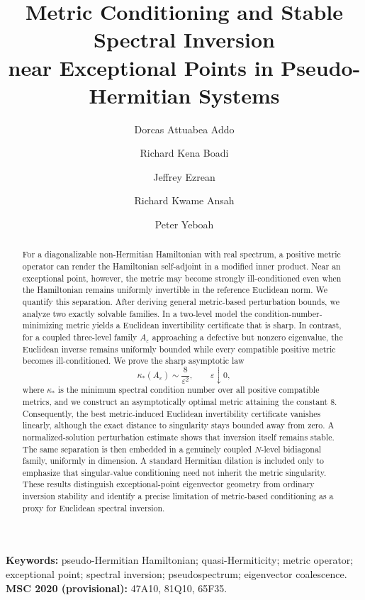 \documentclass[11pt,a4paper]{article}
\title{\bfseries Metric Conditioning and Stable Spectral Inversion\\[3pt]
 near Exceptional Points in Pseudo-Hermitian Systems}
\author[1]{Dorcas Attuabea Addo}
\author[2]{Richard Kena Boadi}
\author[2]{Jeffrey Ezrean}
\author[3]{Richard Kwame Ansah}
\author[4]{Peter Yeboah}
\affil[1]{Department of Mathematics Education, University of Education, Winneba, Ghana}
\affil[2]{Department of Mathematics, Kwame Nkrumah University of Science and Technology, Kumasi, Ghana}
\affil[3]{Department of Mathematics and Statistics, University of Energy and Natural Resources, Sunyani, Ghana}
\affil[4]{Department of Teacher Education, Kwame Nkrumah University of Science and Technology, Kumasi, Ghana}
\date{}
\theoremstyle{definition}\newtheorem{definition}[theorem]{Definition}
\theoremstyle{remark}\newtheorem{remark}[theorem]{Remark}
\begin{document}
\maketitle
\begin{abstract}
For a diagonalizable non-Hermitian Hamiltonian with real spectrum, a positive metric operator
can render the Hamiltonian self-adjoint in a modified inner product.  Near an exceptional
point, however, the metric may become strongly ill-conditioned even when the Hamiltonian
remains uniformly invertible in the reference Euclidean norm.  We quantify this separation.
After deriving general metric-based perturbation bounds, we analyze two exactly solvable
families.  In a two-level model the condition-number-minimizing metric yields a Euclidean
invertibility certificate that is sharp.  In contrast, for a coupled three-level family
$A_\varepsilon$ approaching a defective but nonzero eigenvalue, the Euclidean inverse remains
uniformly bounded while every compatible positive metric becomes ill-conditioned.  We prove
the sharp asymptotic law
\[
 \kappa_*(A_\varepsilon)\sim \frac{8}{\varepsilon^2},\qquad \varepsilon\downarrow0,
\]
where $\kappa_*$ is the minimum spectral condition number over all positive compatible
metrics, and we construct an asymptotically optimal metric attaining the constant $8$.
Consequently, the best metric-induced Euclidean invertibility certificate vanishes linearly,
although the exact distance to singularity stays bounded away from zero.  A normalized-solution
perturbation estimate shows that inversion itself remains stable.  The same separation is then
embedded in a genuinely coupled $N$-level bidiagonal family, uniformly in dimension.  A standard
Hermitian dilation is included only to emphasize that singular-value conditioning need not
inherit the metric singularity.  These results distinguish exceptional-point eigenvector
geometry from ordinary inversion stability and identify a precise limitation of metric-based
conditioning as a proxy for Euclidean spectral inversion.
\end{abstract}
\noindent\textbf{Keywords:} pseudo-Hermitian Hamiltonian; quasi-Hermiticity; metric operator;
exceptional point; spectral inversion; pseudospectrum; eigenvector coalescence.\\
\noindent\textbf{MSC 2020 (provisional):} 47A10, 81Q10, 65F35.
\end{document}
